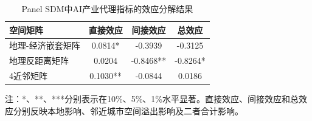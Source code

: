 \begin{table}[htbp]
\centering
\begin{threeparttable}
\caption{Panel SDM中AI产业代理指标的效应分解结果}
\begin{tabular}{lccc}
\toprule
空间矩阵 & 直接效应 & 间接效应 & 总效应 \\
\midrule
地理-经济嵌套矩阵 & 0.0814* & -0.3939 & -0.3125 \\
地理反距离矩阵 & 0.0204 & -0.8468** & -0.8264* \\
4近邻矩阵 & 0.1030** & -0.0844 & 0.0186 \\
\bottomrule
\end{tabular}
\begin{tablenotes}
\footnotesize
\item 注：*、**、***分别表示在10\%、5\%、1\%水平显著。直接效应、间接效应和总效应分别反映本地影响、邻近城市空间溢出影响及二者合计影响。
\end{tablenotes}
\end{threeparttable}
\end{table}

